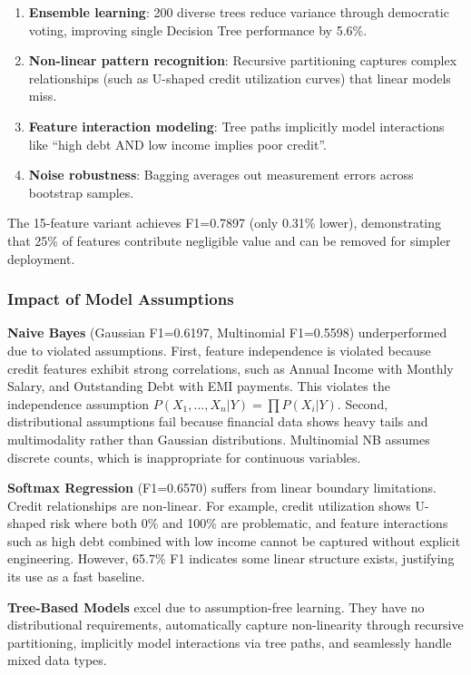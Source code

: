 \documentclass[11pt, a4paper]{article}
\begin{document}
\begin{enumerate}
    \item \textbf{Ensemble learning}: 200 diverse trees reduce variance through democratic voting, improving single Decision Tree performance by 5.6\%.
    \item \textbf{Non-linear pattern recognition}: Recursive partitioning captures complex relationships (such as U-shaped credit utilization curves) that linear models miss.
    \item \textbf{Feature interaction modeling}: Tree paths implicitly model interactions like ``high debt AND low income implies poor credit''.
    \item \textbf{Noise robustness}: Bagging averages out measurement errors across bootstrap samples.
\end{enumerate}

The 15-feature variant achieves F1=0.7897 (only 0.31\% lower), demonstrating that 25\% of features contribute negligible value and can be removed for simpler deployment.

\subsubsection{Impact of Model Assumptions}

\textbf{Naive Bayes} (Gaussian F1=0.6197, Multinomial F1=0.5598) underperformed due to violated assumptions. First, feature independence is violated because credit features exhibit strong correlations, such as Annual Income with Monthly Salary, and Outstanding Debt with EMI payments. This violates the independence assumption $P(X_1,...,X_n|Y)=\prod P(X_i|Y)$. Second, distributional assumptions fail because financial data shows heavy tails and multimodality rather than Gaussian distributions. Multinomial NB assumes discrete counts, which is inappropriate for continuous variables.

\textbf{Softmax Regression} (F1=0.6570) suffers from linear boundary limitations. Credit relationships are non-linear. For example, credit utilization shows U-shaped risk where both 0\% and 100\% are problematic, and feature interactions such as high debt combined with low income cannot be captured without explicit engineering. However, 65.7\% F1 indicates some linear structure exists, justifying its use as a fast baseline.

\textbf{Tree-Based Models} excel due to assumption-free learning. They have no distributional requirements, automatically capture non-linearity through recursive partitioning, implicitly model interactions via tree paths, and seamlessly handle mixed data types.
\end{document}
